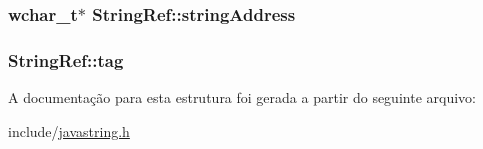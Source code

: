 \subsubsection[{\texorpdfstring{string\+Address}{stringAddress}}]{\setlength{\rightskip}{0pt plus 5cm}wchar\+\_\+t$\ast$ String\+Ref\+::string\+Address}\hypertarget{struct_string_ref_ae38ec52f1790f3c3cfb82c0ebcf72d2d}{}\label{struct_string_ref_ae38ec52f1790f3c3cfb82c0ebcf72d2d}
\subsubsection[{\texorpdfstring{tag}{tag}}]{ String\+Ref\+::tag}\hypertarget{struct_string_ref_a4d039a824a7ac849742acb2cbbfce77d}{}\label{struct_string_ref_a4d039a824a7ac849742acb2cbbfce77d}


A documentação para esta estrutura foi gerada a partir do seguinte arquivo\+:\begin{DoxyCompactItemize}
\item 
include/\hyperlink{javastring_8h}{javastring.\+h}\end{DoxyCompactItemize}

